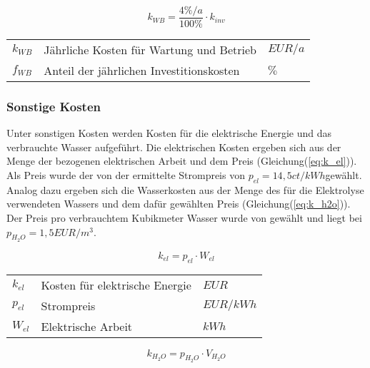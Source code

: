 \documentclass[onecolumn,10pt,titlepage]{article}
\begin{document}
				\begin{equation}
				\label{eq:k_WartBetr}
				k_{WB} = \frac{4\%/a}{100\%}\cdot k_{inv}
				\end{equation}
				
				\begin{table}[H]
					\begin{tabular*}{\textwidth}{lll}
						$k_{WB}$&Jährliche Kosten für Wartung und Betrieb&	$EUR/a$\\
						$f_{WB}$&	Anteil der jährlichen Investitionskosten&$\%$\\
					\end{tabular*}
				\end{table}
							
				\subsubsection*{Sonstige Kosten}
				Unter sonstigen Kosten werden Kosten für die elektrische Energie und das verbrauchte Wasser aufgeführt. Die elektrischen Kosten ergeben sich aus der Menge der bezogenen elektrischen Arbeit und dem Preis (Gleichung(\ref{eq:k_el})). Als Preis wurde der von der \cite{DeutscheEnergieAgenturGmbH.06.2018} ermittelte Strompreis von $p_{el} = 14,5 ct/kWh$gewählt. Analog dazu ergeben sich die Wasserkosten aus der Menge des für die Elektrolyse verwendeten Wassers und dem dafür gewählten Preis (Gleichung(\ref{eq:k_h2o})). Der Preis pro verbrauchtem Kubikmeter Wasser wurde von \cite{Hey.26.Oktober2012} gewählt und liegt bei $p_{H_2O} = 1,5 EUR/m^3$. 
				
				\begin{equation}
				\label{eq:k_el}
				k_{el} = p_{el}\cdot W_{el}
				\end{equation}
				
				\begin{table}[H]
					\begin{tabular*}{\textwidth}{lll}
						$k_{el}$&Kosten für elektrische Energie&$EUR$\\
						$p_{el}$&Strompreis&$EUR/kWh$\\
						$W_{el}$&Elektrische Arbeit&$kWh$\\
					\end{tabular*}
				\end{table}
				
				\begin{equation}
				\label{eq:k_h2o}
				k_{H_2O} = p_{H_2O} \cdot V_{H_2O}
				\end{equation}
				
\end{document}
